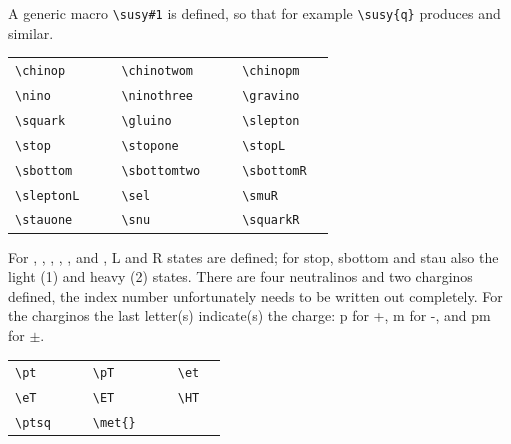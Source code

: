 \documentclass[11pt,a4paper]{atlasnote}
\begin{document}
\medskip

\noindent A generic macro \verb+\susy#1+ is defined, so that for
example \verb+\susy{q}+ produces  and similar.

\medskip

\begin{tabular}{llcllcll}
  \verb+\chinop+ & \chinop{} & \hspace{1cm} &
  \verb+\chinotwom+ & \chinotwom{} & \hspace{1cm} &
  \verb+\chinopm+ & \chinopm{} \\
  \verb+\nino+ & \nino{} & &
  \verb+\ninothree+ & \ninothree{} & &
  \verb+\gravino+ & \gravino{} \\
  \verb+\squark+ & \squark{} & &
  \verb+\gluino+ & \gluino{} & &
  \verb+\slepton+ & \slepton{} \\
  \verb+\stop+ & \stop{} & &
  \verb+\stopone+ & \stopone{} & &
  \verb+\stopL+ & \stopL{} \\
  \verb+\sbottom+ & \sbottom{} & &
  \verb+\sbottomtwo+ & \sbottomtwo{} & &
  \verb+\sbottomR+ & \sbottomR{} \\
  \verb+\sleptonL+ & \sleptonL{} & &
  \verb+\sel+ & \sel{} & &
  \verb+\smuR+ & \smuR{} \\
  \verb+\stauone+ & \stauone{} & &
  \verb+\snu+ & \snu{} & &
  \verb+\squarkR+ & \squarkR{} \\
\end{tabular}

\medskip

\noindent For , , , \slepton, \sel, \smu and
\stau, L and R states are defined; for stop, sbottom and stau also the
light (1) and heavy (2) states. There are four neutralinos and two
charginos defined, the index number unfortunately needs to be written
out completely. For the charginos the last letter(s) indicate(s) the
charge: p for +, m for -, and pm for $\pm$.

\medskip

\begin{tabular}{llcllcll}
  \verb+\pt+ & \pt{} & \hspace{1cm} &
  \verb+\pT+ & \pT{} & \hspace{1cm} &
  \verb+\et+ & \et{} \\
  \verb+\eT+ & \eT{} & &
  \verb+\ET+ & \ET{} & &
  \verb+\HT+ & \HT{} \\
  \verb+\ptsq+ & \ptsq{} & &
  \verb+\met{}+ & \met{} & &
\end{tabular}

\medskip
\end{document}
